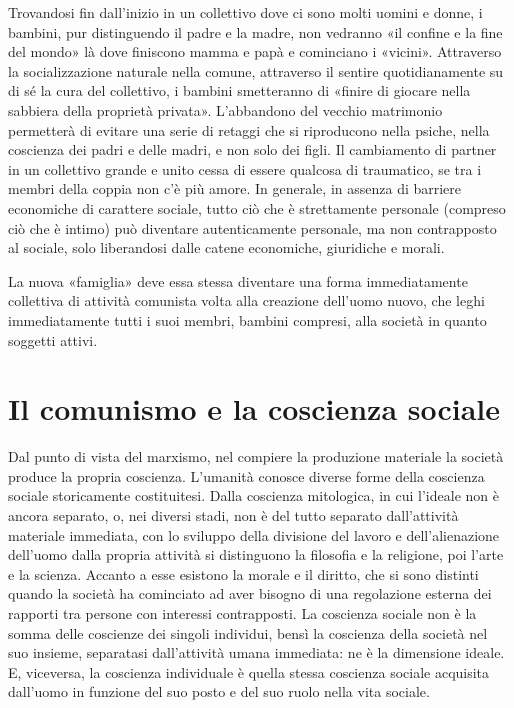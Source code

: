 \documentclass[12pt,a4paper,openany]{book}
\begin{document}
Trovandosi fin dall'inizio in un collettivo dove ci sono molti uomini e donne, i bambini, pur distinguendo il padre e la madre, non vedranno «il confine e la fine del mondo» là dove finiscono mamma e papà e cominciano i «vicini». Attraverso la socializzazione naturale nella comune, attraverso il sentire quotidianamente su di sé la cura del collettivo, i bambini smetteranno di «finire di giocare nella sabbiera della proprietà privata». L'abbandono del vecchio matrimonio permetterà di evitare una serie di retaggi che si riproducono nella psiche, nella coscienza dei padri e delle madri, e non solo dei figli. Il cambiamento di partner in un collettivo grande e unito cessa di essere qualcosa di traumatico, se tra i membri della coppia non c'è più amore. In generale, in assenza di barriere economiche di carattere sociale, tutto ciò che è strettamente personale (compreso ciò che è intimo) può diventare autenticamente personale, ma non contrapposto al sociale, solo liberandosi dalle catene economiche, giuridiche e morali.

La nuova «famiglia» deve essa stessa diventare una forma immediatamente collettiva di attività comunista volta alla creazione dell'uomo nuovo, che leghi immediatamente tutti i suoi membri, bambini compresi, alla società in quanto soggetti attivi.
\ifSubfilesClassLoaded{\setcounter{page}{54}}{}
\section{Il comunismo e la coscienza sociale}
\label{sec:10_comunismo_coscienza}

Dal punto di vista del marxismo, nel compiere la produzione materiale la società produce la propria coscienza. L'umanità conosce diverse forme della coscienza sociale storicamente costituitesi. Dalla coscienza mitologica, in cui l'ideale non è ancora separato, o, nei diversi stadi, non è del tutto separato dall'attività materiale immediata, con lo sviluppo della divisione del lavoro e dell'alienazione dell'uomo dalla propria attività si distinguono la filosofia e la religione, poi l'arte e la scienza. Accanto a esse esistono la morale e il diritto, che si sono distinti quando la società ha cominciato ad aver bisogno di una regolazione esterna dei rapporti tra persone con interessi contrapposti. La coscienza sociale non è la somma delle coscienze dei singoli individui, bensì la coscienza della società nel suo insieme, separatasi dall'attività umana immediata: ne è la dimensione ideale. E, viceversa, la coscienza individuale è quella stessa coscienza sociale acquisita dall'uomo in funzione del suo posto e del suo ruolo nella vita sociale.
\end{document}
